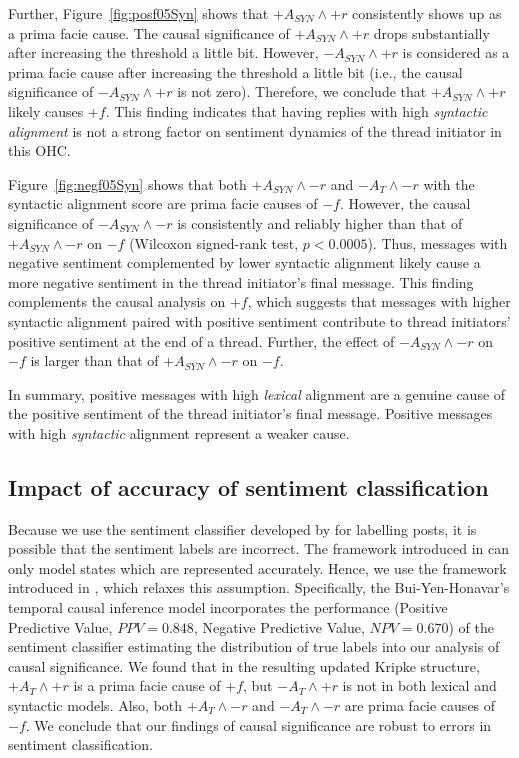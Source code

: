 \documentclass[man,biblatex,floatsintext]{apa6}
\begin{document}
Further, Figure~\ref{fig:posf05Syn} shows that $+A_{SYN} \wedge +r$ consistently shows up as a prima facie cause. The causal significance of $+A_{SYN} \wedge +r$ drops substantially after increasing the threshold a little bit. However, $-A_{SYN} \wedge +r$ is considered as a prima facie cause after increasing the threshold a little bit (i.e., the causal significance of $-A_{SYN} \wedge +r$ is not zero). Therefore, we conclude that $+A_{SYN} \wedge +r$ likely causes $+f$. This finding indicates that having replies with high \emph{syntactic alignment} is not a strong factor on sentiment dynamics of the thread initiator in this OHC.

Figure~\ref{fig:negf05Syn} shows that both $+A_{SYN} \wedge -r$ and $-A_T \wedge -r$ with the syntactic alignment score are prima facie causes of $-f$. However, the causal significance of $-A_{SYN} \wedge -r$ is consistently and reliably higher than that of $+A_{SYN} \wedge -r$ on $-f$ (Wilcoxon signed-rank test, $p<0.0005$). Thus, messages with negative sentiment complemented by lower syntactic alignment likely cause a more negative sentiment in the thread initiator's final message. This finding complements the causal analysis on $+f$, which suggests that messages with higher syntactic alignment paired with positive sentiment contribute to thread initiators' positive sentiment at the end of a thread. Further, the effect of $-A_{SYN} \wedge -r$ on $-f$ is larger than that of $+A_{SYN} \wedge -r$ on $-f$.

In summary, positive messages with high \emph{lexical} alignment are a genuine cause of the positive sentiment of the thread initiator's final message. Positive messages with high \emph{syntactic} alignment represent a weaker cause.


\subsection{Impact of accuracy of sentiment classification}

Because we use the sentiment classifier developed by \textcite{qiu2011get} for labelling posts, it is possible that the sentiment labels are incorrect. The  framework introduced in \textcite{kleinberg_uai09} can only model states which are represented accurately. Hence, we use the framework introduced in \textcite{bui2016temporal}, which relaxes this assumption. Specifically, the Bui-Yen-Honavar's temporal causal inference model incorporates the performance (Positive Predictive Value, $PPV=0.848$, Negative Predictive Value, $NPV= 0.670$) of the sentiment classifier estimating the distribution of true labels into our analysis of causal significance.
We found that in the resulting updated Kripke structure, $+A_T \wedge +r$ is a prima facie cause of $+f$, but $-A_T \wedge +r$ is not in both lexical and syntactic models. Also, both $+A_T \wedge -r$ and $-A_T \wedge -r$ are prima facie causes of $-f$. We conclude that our findings of causal significance are robust to errors in sentiment classification.
\end{document}
